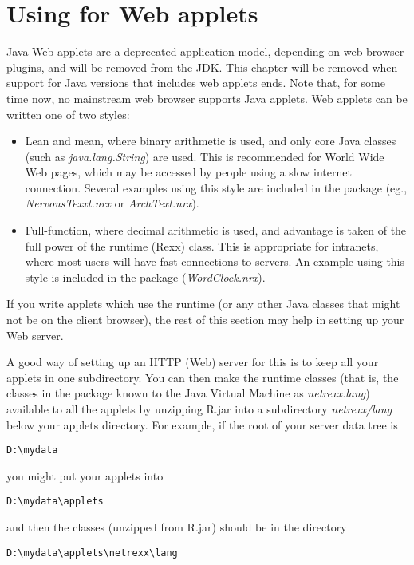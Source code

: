 \chapter{Using \nr{} for Web applets}
Java Web applets are a deprecated application model, depending on web
browser plugins, and will be removed from the JDK. This
chapter will be removed when \nr{} support for Java versions that
includes web applets ends. Note that, for some time now, no mainstream web browser
supports Java applets.
Web applets can be written one of two styles:
\begin{itemize}
\item Lean and mean, where binary arithmetic is used, and only core
Java classes (such as \emph{java.lang.String}) are used.  This is
recommended for World Wide Web pages, which may be accessed by people
using a slow internet connection.
Several examples using this style are included in the \nr{} package
(eg., \emph{NervousTexxt.nrx} or \emph{ArchText.nrx}).
\item Full-function, where decimal arithmetic is used, and advantage is
taken of the full power of the \nr{} runtime (Rexx) class.
This is appropriate for intranets, where most users will have fast
connections to servers.
An example using this style is included in the \nr{} package
(\emph{WordClock.nrx}).
\end{itemize}
If you write applets which use the \nr{} runtime (or any other Java
classes that might not be on the client browser), the rest of this
section may help in setting up your Web server.

A good way of setting up an HTTP (Web) server for this is to keep all
your applets in one subdirectory.  You can then make the \nr{} runtime
classes (that is, the classes in the package known to the Java Virtual
Machine as \emph{netrexx.lang}) available to all the applets by
unzipping \nr{}R.jar into a subdirectory \emph{netrexx/lang} below
your applets directory.
\newline
For example, if the root of your server data tree is
\begin{verbatim}
D:\mydata
\end{verbatim}
 you might put your applets into
\begin{verbatim}
D:\mydata\applets
\end{verbatim}
and then the \nr{} classes (unzipped from \nr{}R.jar) should be in
the directory
\begin{verbatim}
D:\mydata\applets\netrexx\lang
\end{verbatim}

